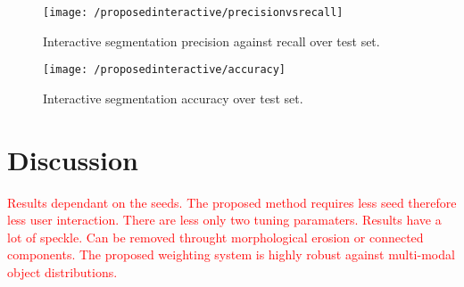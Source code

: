 \begin{figure}[!h]
	\centering
	\texttt{[image: /proposedinteractive/precisionvsrecall]}
	\caption{Interactive segmentation precision against recall over test set.}
	\label{fig:interactiveprecisionvsrecall}
\end{figure}

\begin{figure}[!t]
	\centering
	\texttt{[image: /proposedinteractive/accuracy]}
	\caption{Interactive segmentation accuracy over test set.}
	\label{fig:interactiveaccuracy}
\end{figure}

\newpage
\section{Discussion}
\textcolor{red}{Results dependant on the seeds. The proposed method requires less seed therefore less user interaction. There are less only two tuning paramaters. Results have a lot of speckle. Can be removed throught morphological erosion or connected components. The proposed weighting system is highly robust against multi-modal object distributions.}
